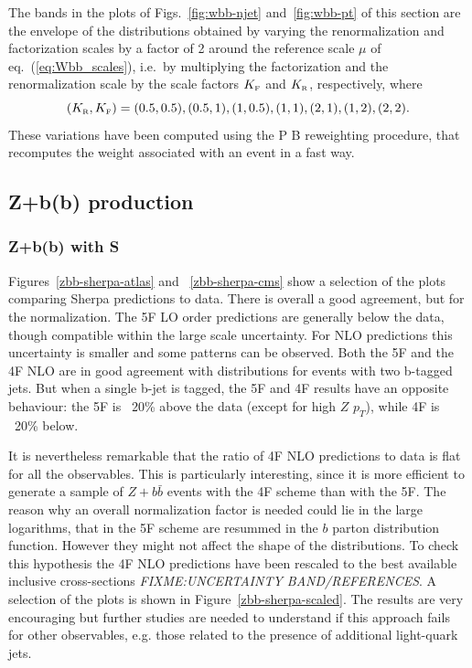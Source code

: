 \documentclass[11pt]{cernrep}
\newcommand{\Sherpa}{S\protect\scalebox{0.8}{HERPA}\xspace}
\newcommand{\pt}{\ensuremath{p_{T}}\xspace}
\newcommand\KRA{K_{\scriptscriptstyle \rm R}}
\newcommand\KFA{K_{\scriptscriptstyle \rm F}}
\newcommand{\POWHEGBOX}{P\protect\scalebox{0.8}{OWHEG} B\protect\scalebox{0.8}{OX}\xspace}
\begin{document}
\begin{enumerate}
The bands in the plots of Figs.~\ref{fig:wbb-njet}
and~\ref{fig:wbb-pt} of this section are the envelope of the
distributions obtained by varying the renormalization and factorization
scales by a factor of 2 around the reference scale $\mu$ of
eq.~(\ref{eq:Wbb_scales}), i.e.~by multiplying the factorization and the
renormalization scale by the scale factors $\KFA$ and $\KRA$, respectively,
where
\begin{equation}
\label{eq:KRA_KFA}
(\KRA,\KFA)=(0.5,0.5),  (0.5,1), (1,0.5), (1,1),(2,1),(1,2),(2,2).
\end{equation}
These variations have been computed using the \POWHEGBOX{} reweighting
procedure, that recomputes the weight associated with an event in a fast way.
\end{enumerate}

\subsection{Z+b(b) production \label{Zbb}}

\subsubsection{Z+b(b) with \Sherpa}

Figures~\ref{zbb-sherpa-atlas} and ~\ref{zbb-sherpa-cms} show a selection of
the plots comparing Sherpa predictions to data.  There is overall a good
agreement, but for the normalization. The 5F LO order predictions are
generally below the data, though compatible within the large scale
uncertainty. For NLO predictions this uncertainty is smaller and some
patterns can be observed. Both the 5F and the 4F NLO are in good agreement
with distributions for events with two b-tagged jets.  But when a single
b-jet is tagged, the 5F and 4F results have an opposite behaviour: the 5F is
~20\% above the data (except for high $Z$ \pt), while 4F is ~20\% below.

It is nevertheless remarkable that the ratio of 4F NLO predictions to data is
flat for all the observables. This is particularly interesting, since it is
more efficient to generate a sample of $Z+b\bar{b}$ events with the 4F scheme
than with the 5F. The reason why an overall normalization factor is needed
could lie in the large logarithms, that in the 5F scheme are resummed in the
$b$ parton distribution function. However they might not affect the shape of
the distributions. To check this hypothesis the 4F NLO predictions have been
rescaled to the best available inclusive cross-sections {\em
  FIXME:UNCERTAINTY BAND/REFERENCES}. A selection of the plots is shown in
Figure~\ref{zbb-sherpa-scaled}. The results are very encouraging but further
studies are needed to understand if this approach fails for other
observables, e.g. those related to the presence of additional light-quark
jets.
\end{document}
